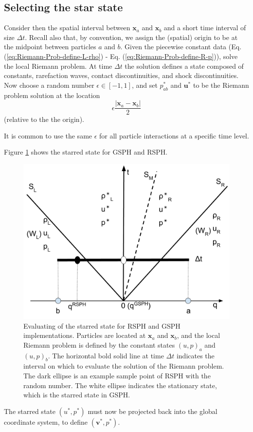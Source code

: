 \documentclass[review]{elsarticle}
\begin{document}
\subsection{Selecting the star state} \label{sec:Picking-up-single-state}
Consider then the spatial interval between $\textbf{x}_{a}$ and $\textbf{x}_{ b}$ and a short time interval of size $\Delta t$. Recall also that, by convention, we assign the (spatial) origin to be at the midpoint between particles $a$ and $b$.
Given the piecewise constant data (Eq. (\ref{eq:Riemann-Prob-define-L-rho}) - Eq. (\ref{eq:Riemann-Prob-define-R-p})), solve the local Riemann problem. At time $\Delta t$ the solution defines a state composed of constants, rarefaction waves, contact discontinuities, and shock discontinuities. 
Now choose a random number $\epsilon \in [-1,1]$, and set $p_{a b}^{\ast}$ and $\textbf{u}^{\ast}$ to be the Riemann problem solution at the location 
$$
\epsilon \frac{|\textbf{x}_{a} - \textbf{x}_{ b}|}{2}
$$
(relative to the the origin).

It is common to use the same $\epsilon$ for all particle interactions at a specific time level.

Figure \ref{fig:pick-up-state-GSPH-RSPH} shows the starred state for GSPH and RSPH.
\begin{figure}[H]
    \center
	\includegraphics[width=0.5 \textwidth]{./Figures/RSPH-GSPH}
    \caption{Evaluating of the starred state for  RSPH and GSPH implementations.
Particles are located at $\textbf{x}_{a} $ and $ \textbf{x}_{ b}$, and the local Riemann problem is defined by the constant states $(u, p)_a$ and $(u,p)_b$. The horizontal bold solid line at time $\Delta t$ indicates the interval on which to evaluate the solution of the Riemann problem. The dark ellipse is an example sample point of RSPH with the random number. The white ellipse indicates the stationary state, which is the starred state in GSPH.}
    \label{fig:pick-up-state-GSPH-RSPH}
\end{figure}

The starred state $(u^{\ast},  p^{\ast})$ must now be projected back into the global coordinate system, to define  $(\textbf{v}^{\ast},  p^{\ast})$.
\end{document}

